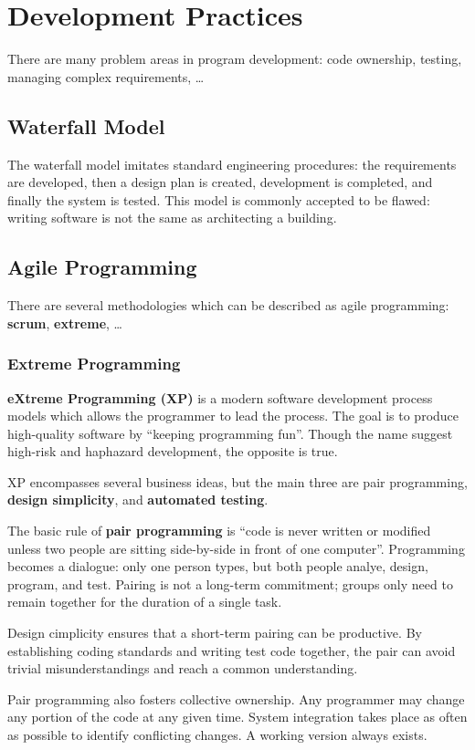 \documentclass[12pt]{article}
\begin{document}
\section{Development Practices}
There are many problem areas in program development: code ownership, testing, managing complex requirements, \dots

\subsection{Waterfall Model}
The waterfall model imitates standard engineering procedures: the requirements are developed, then a design plan is created, development is completed, and finally the system is tested. This model is commonly accepted to be flawed: writing software is not the same as architecting a building.

\subsection{Agile Programming}
There are several methodologies which can be described as agile programming: {\bf scrum}, {\bf extreme}, \dots

\subsubsection{Extreme Programming}
{\bf eXtreme Programming (XP)} is a modern software development process models which allows the programmer to lead the process. The goal is to produce high-quality software by ``keeping programming fun''. Though the name suggest high-risk and haphazard development, the opposite is true.

XP encompasses several business ideas, but the main three are pair programming, {\bf design simplicity}, and {\bf automated testing}.

The basic rule of {\bf pair programming} is ``code is never written or modified unless two people are sitting side-by-side in front of one computer''. Programming becomes a dialogue: only one person types, but both people analye, design, program, and test. Pairing is not a long-term commitment; groups only need to remain together for the duration of a single task.

Design cimplicity ensures that a short-term pairing can be productive. By establishing coding standards and writing test code together, the pair can avoid trivial misunderstandings and reach a common understanding.

Pair programming also fosters collective ownership. Any programmer may change any portion of the code at any given time. System integration takes place as often as possible to identify conflicting changes. A working version always exists.
\end{document}
